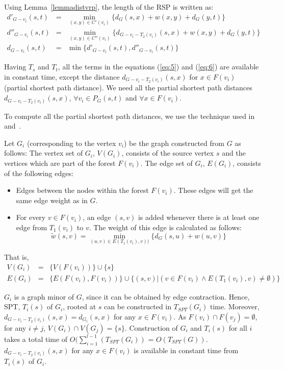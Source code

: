 \documentclass[11pt,a4paper]{llncs}
\begin{document}
Using Lemma~\ref{lemmadistvrp}, the length of the RSP is written as:
\begin{eqnarray}
d'_{G-v_{i}}(s,t) &=&  \min_{(x,y) \in C'(v_{i})}\{ d_{G}(s,x) + w(x,y) + d_{G}(y,t) \}  \label{eq:5}\\
  d''_{G-v_{i}}(s,t) &=&  \min_{(x,y) \in C''(v_{i})}\{ d_{G-v_{i}-T_{2}(v_{i})}(s,x) + w(x,y) + d_{G}(y,t) \}\label{eq:6}\\
  d_{G-v_{i}}(s,t) &=& \min \{ d'_{G-v_{i}}(s,t), d''_{G-v_{i}}(s,t)\}
\end{eqnarray}

Having $T_{s}$ and $T_{t}$, all the terms in the equations (\ref{eq:5}) and (\ref{eq:6}) are available in constant time, except the distance $d_{G-v_{i}-T_{2}(v_{i})}(s,x)$ for $x \in F(v_{i})$ (partial shortest path distance).
We need all the partial shortest path distances $d_{G-v_{i}-T_{2}(v_{i})}(s,x)$, $\forall v_{i} \in P_{G}(s,t)$ and $\forall x \in F(v_{i})$.

To compute all the partial shortest path distances, we use the technique used in~\cite{jay} and~\cite{linearrsp}.

Let $G_{i}$ (corresponding to the vertex $v_{i}$) be the graph constructed from $G$ as follows:
The vertex set of $G_{i}$, $V(G_{i})$, consists of the source vertex $s$ and the vertices which are
part of the forest $F(v_{i})$. The edge set of $G_{i}$, $E(G_{i})$, consists of the following edges:

\begin{itemize}
  \item Edges between the nodes within the forest $F(v_{i})$.
        These edges will get the same edge weight as in $G$.
  \item For every $v \in F(v_{i})$, an edge $(s, v)$ is added whenever there
       is at least one edge from $T_{1}(v_{i})$ to $v$.
       The weight of this edge is calculated as follows:
       \begin{equation}
       \widetilde{w}(s,v) = \min_{(u,v)\in E(T_{1}(v_{i}), v))} \{d_{G}(s,u)+w(u, v)\}
       \end{equation}
  \end{itemize}
That is,
\begin{eqnarray}
V(G_{i}) &=&  \{ V(F(v_{i}))\} \cup \{s\} \\
  E(G_{i}) &=&  \{ E(F(v_{i}), F(v_{i}))\} \cup \{  (s, v) | (v \in F(v_{i}) \wedge E(T_{1}(v_{i}), v) \neq \emptyset) \}
\end{eqnarray}

$G_{i}$ is a graph minor of $G$, since it can be obtained by edge contraction.
Hence, SPT, $T_{i}(s)$ of $G_{i}$, rooted at $s$ can be constructed in $T_{SPT}(G_{i})$ time.
Moreover, $d_{G-v_{i}-T_{2}(v_{i})}(s,x) = d_{G_{i}}(s, x)$ for any $x \in F(v_{i})$.
As $F(v_{i}) \cap F(v_{j}) = \emptyset$, for any $i \neq j$, $V(G_{i}) \cap V(G_{j}) = \{s\}$.
Construction of $G_{i}$ and $T_{i}(s)$ for all $i$ takes a total time of $O(\sum_{i=1}^{l-1}(T_{SPT}(G_{i}))$ = $O(T_{SPT}(G))$.
$d_{G-v_{i}-T_{2}(v_{i})}(s,x)$ for any $x \in F(v_{i})$ is available in constant time from $T_{i}(s)$ of $G_{i}$.
\end{document}
